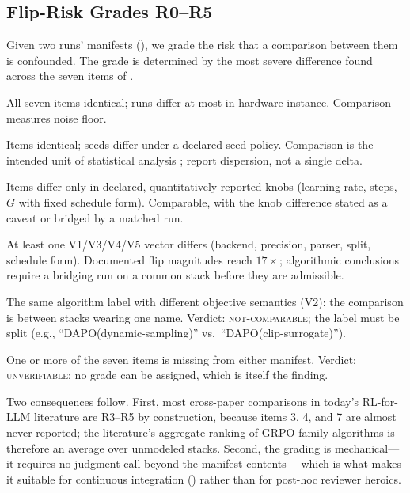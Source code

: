 \subsection{Flip-Risk Grades R0--R5}
\label{sec:p5-grades}
Given two runs' manifests (), we grade the risk that
a comparison between them is confounded. The grade is determined by the most
severe difference found across the seven items of
.
\begin{description}[leftmargin=1.5em, itemsep=2pt, topsep=2pt]
\item[R0 --- Replicate.] All seven items identical; runs differ at most in
hardware instance. Comparison measures noise floor.
\item[R1 --- Seed-only.] Items identical; seeds differ under a declared seed
policy. Comparison is the intended unit of statistical analysis
\citep{colas2019hitchhiker, agarwal2021deep}; report dispersion, not a single
delta.
\item[R2 --- Declared-knob.] Items differ only in declared, quantitatively
reported knobs (learning rate, steps, $G$ with fixed schedule form).
Comparable, with the knob difference stated as a caveat or bridged by a
matched run.
\item[R3 --- Stack-vector.] At least one V1/V3/V4/V5 vector differs
(backend, precision, parser, split, schedule form). Documented flip
magnitudes reach $17\times$; algorithmic conclusions require a bridging run
on a common stack before they are admissible.
\item[R4 --- Label collision.] The same algorithm label with different
objective semantics (V2): the comparison is between stacks wearing one name.
Verdict: \textsc{not-comparable}; the label must be split (e.g.,
``DAPO(dynamic-sampling)'' vs.\ ``DAPO(clip-surrogate)'').
\item[R5 --- Undeclared.] One or more of the seven items is missing from
either manifest. Verdict: \textsc{unverifiable}; no grade can be assigned,
which is itself the finding.
\end{description}
Two consequences follow. First, most cross-paper comparisons in today's
RL-for-LLM literature are R3--R5 by construction, because items 3, 4, and 7
are almost never reported; the literature's aggregate ranking of GRPO-family
algorithms is therefore an average over unmodeled stacks. Second, the grading
is mechanical---it requires no judgment call beyond the manifest contents---
which is what makes it suitable for continuous integration
() rather than for post-hoc reviewer heroics.
